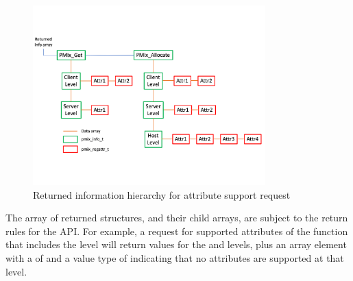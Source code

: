 \begingroup
\begin{figure}[ht!]
  \begin{center}
    \includegraphics[clip,width=0.8\textwidth]{figs/attrquery.pdf}
  \end{center}
  \caption{Returned information hierarchy for attribute support request}
  \label{fig:attrquery}
\end{figure}
\endgroup

The array of returned structures, and their child arrays, are subject to the return rules for the  \ac{API}. For example, a request for supported attributes of the  function that includes the  level will return values for the  and  levels, plus an array element with a  of  and a value type of  indicating that no attributes are supported at that level.

